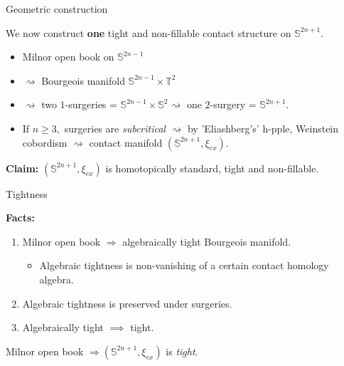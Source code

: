 \documentclass{beamer}
\begin{document}
\begin{frame}{Geometric construction}
    
    We now construct \textbf{one} tight and non-fillable contact structure on $\mathbb S^{2n+1}$.
    
    \medskip
    
    \pause

    \begin{itemize}
    \item Milnor open book on $\mathbb S^{2n-1}$
    \medskip \pause
    \item $\rightsquigarrow$ Bourgeois manifold $\mathbb S^{2n-1}\times \mathbb T^2$
    \medskip \pause
    \item $\rightsquigarrow $ two $1$-surgeries = $\mathbb S^{2n-1}\times \mathbb S^2 \rightsquigarrow$ one $2$-surgery = $\mathbb S^{2n+1}.$ 
    \medskip \pause   
    \item If $n\geq 3,$ surgeries are \emph{subcritical} $\rightsquigarrow$ by 'Eliashberg's' h-pple, 
    Weinstein cobordism $\rightsquigarrow$ contact manifold $(\mathbb S^{2n+1},\xi_{ex})$.
    \end{itemize}

    \pause
    
    \medskip

    \begin{tcolorbox}
    \textbf{Claim:} $(\mathbb S^{2n+1},\xi_{ex})$ is homotopically standard, tight and non-fillable.
    \end{tcolorbox}
    
\end{frame}

\begin{frame}{Tightness}

    \textbf{Facts:} \begin{enumerate}
        \item Milnor open book $\Rightarrow$  algebraically tight Bourgeois manifold.
        \pause
        \begin{itemize}
            \item Algebraic tightness is non-vanishing of a certain contact homology algebra.
        \end{itemize}
        \pause
        \item Algebraic tightness is preserved under surgeries.
        \pause
        \item Algebraically tight $\implies$ tight.
    \end{enumerate}
    
    \pause
    
    \vspace*{1cm}
    
    \begin{tcolorbox}
        Milnor open book $\Rightarrow (\mathbb S^{2n+1},\xi_{ex})$ is \emph{tight}.
    \end{tcolorbox}
    
\end{frame}
\end{document}
